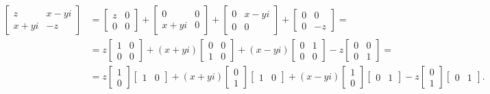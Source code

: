 \begin{align*}
  \begin{bmatrix} z & x-yi\\ x + yi & -z \end{bmatrix} & = \begin{bmatrix} z & 0\\ 0 & 0 \end{bmatrix} + \begin{bmatrix} 0 & 0 \\ x + yi & 0 \end{bmatrix} + \begin{bmatrix} 0 & x-yi\\ 0 & 0 \end{bmatrix} + \begin{bmatrix} 0 & 0 \\ 0 & -z \end{bmatrix} = \\
  & = z \begin{bmatrix} 1 & 0\\ 0 & 0 \end{bmatrix} + (x + yi)\begin{bmatrix} 0 & 0 \\ 1 & 0 \end{bmatrix} + (x-yi)\begin{bmatrix} 0 & 1\\ 0 & 0 \end{bmatrix} - z\begin{bmatrix} 0 & 0 \\ 0 & 1 \end{bmatrix} = \\
  & = z \begin{bmatrix} 1 \\ 0 \end{bmatrix}\begin{bmatrix} 1 & 0 \end{bmatrix} + (x + yi)\begin{bmatrix} 0 \\ 1 \end{bmatrix}\begin{bmatrix} 1 & 0 \end{bmatrix} + (x-yi)\begin{bmatrix} 1 \\ 0 \end{bmatrix}\begin{bmatrix} 0 & 1 \end{bmatrix} - z\begin{bmatrix} 0 \\ 1 \end{bmatrix}\begin{bmatrix} 0 & 1 \end{bmatrix}.
\end{align*}
